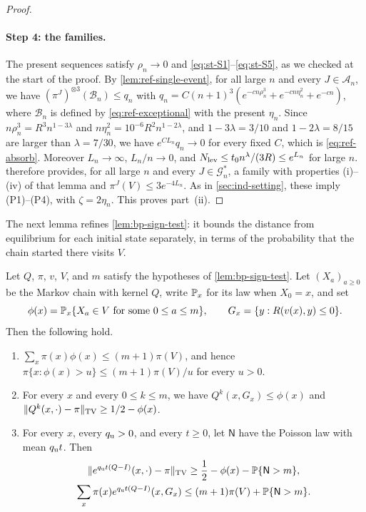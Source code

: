 \begin{proof}
\paragraph{Step 4: the families.} The present sequences satisfy $\rho_n\to0$ and \eqref{eq:st-S1}--\eqref{eq:st-S5}, as we checked at the start of the proof. By \cref{lem:ref-single-event}, for all large $n$ and every $J\in\mathcal A_n$, we have $(\pi^J)^{\otimes3}(\mathcal B_n)\le q_n$ with $q_n=C(n+1)^3(e^{-cn\rho_n^3}+e^{-cn\eta_n^2}+e^{-cn})$, where $\mathcal B_n$ is defined by \eqref{eq:ref-exceptional} with the present $\eta_n$. Since $n\rho_n^3=R^3n^{1-3\lambda}$ and $n\eta_n^2=10^{-6}R^2n^{1-2\lambda}$, and $1-3\lambda=3/10$ and $1-2\lambda=8/15$ are larger than $\lambda=7/30$, we have $e^{CL_n}q_n\to0$ for every fixed $C$, which is \eqref{eq:ref-absorb}. Moreover $L_n\to\infty$, $L_n/n\to0$, and $N_{\rm lev}\le t_0n^\lambda/(3R)\le e^{L_n}$ for large $n$.  therefore provides, for all large $n$ and every $J\in\mathcal G_n^*$, a family with properties (i)--(iv) of that lemma and $\pi^J(V)\le3e^{-4L_n}$. As in \cref{sec:ind-setting}, these imply (P1)--(P4), with $\zeta=2\eta_n$. This proves part~(ii).
\end{proof}

The next lemma refines \cref{lem:bp-sign-test}: it bounds the distance from equilibrium for each initial state separately, in terms of the probability that the chain started there visits $V$.

\begin{lemma}\label{lem:bp-per-start}
Let $Q$, $\pi$, $v$, $V$, and $m$ satisfy the hypotheses of \cref{lem:bp-sign-test}. Let $(X_a)_{a\ge0}$ be the Markov chain with kernel $Q$, write $\mathbb P_x$ for its law when $X_0=x$, and set
\[
 \phi(x)=\mathbb P_x\{X_a\in V\text{ for some }0\le a\le m\},\qquad G_x=\{y:R(v(x),y)\le0\}.
\]
Then the following hold.
\begin{enumerate}[label=\textup{(\alph*)}]
\item $\sum_x\pi(x)\phi(x)\le(m+1)\pi(V)$, and hence $\pi\{x:\phi(x)>u\}\le(m+1)\pi(V)/u$ for every $u>0$.
\item For every $x$ and every $0\le k\le m$, we have $Q^k(x,G_x)\le \phi(x)$ and $\lVert Q^k(x,\cdot)-\pi\rVert_{\mathrm{TV}}\ge1/2-\phi(x)$.
\item For every $x$, every $q_{\rm u}>0$, and every $t\ge0$, let $\mathsf N$ have the Poisson law with mean $q_{\rm u}t$. Then
\[
 \begin{gathered}
 \lVert e^{q_{\rm u}t(Q-I)}(x,\cdot)-\pi\rVert_{\mathrm{TV}}\ge\frac12-\phi(x)-\mathbb P\{\mathsf N>m\},\\
 \sum_x\pi(x)e^{q_{\rm u}t(Q-I)}(x,G_x)\le(m+1)\pi(V)+\mathbb P\{\mathsf N>m\}.
 \end{gathered}
\]
\end{enumerate}
\end{lemma}

